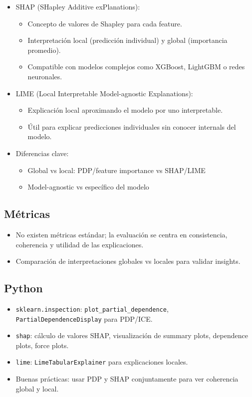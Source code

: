\documentclass[12pt,a4paper,openany,oneside]{book}
\begin{document}
\begin{itemize}
\begin{itemize}
    \item SHAP (SHapley Additive exPlanations):
    \begin{itemize}
        \item Concepto de valores de Shapley para cada feature.
        \item Interpretación local (predicción individual) y global (importancia promedio).
        \item Compatible con modelos complejos como XGBoost, LightGBM o redes neuronales.
    \end{itemize}
    
    \item LIME (Local Interpretable Model-agnostic Explanations):
    \begin{itemize}
        \item Explicación local aproximando el modelo por uno interpretable.
        \item Útil para explicar predicciones individuales sin conocer internals del modelo.
    \end{itemize}
    
    \item Diferencias clave:
    \begin{itemize}
        \item Global vs local: PDP/feature importance vs SHAP/LIME
        \item Model-agnostic vs específico del modelo
    \end{itemize}
\end{itemize}

\subsection{Métricas}
\begin{itemize}
    \item No existen métricas estándar; la evaluación se centra en consistencia, coherencia y utilidad de las explicaciones.
    \item Comparación de interpretaciones globales vs locales para validar insights.
\end{itemize}

\subsection{Python}
\begin{itemize}
    \item \texttt{sklearn.inspection}: \texttt{plot\_partial\_dependence}, \texttt{PartialDependenceDisplay} para PDP/ICE.
    \item \texttt{shap}: cálculo de valores SHAP, visualización de summary plots, dependence plots, force plots.
    \item \texttt{lime}: \texttt{LimeTabularExplainer} para explicaciones locales.
    \item Buenas prácticas: usar PDP y SHAP conjuntamente para ver coherencia global y local.
\end{itemize}


\end{itemize}
\end{document}
